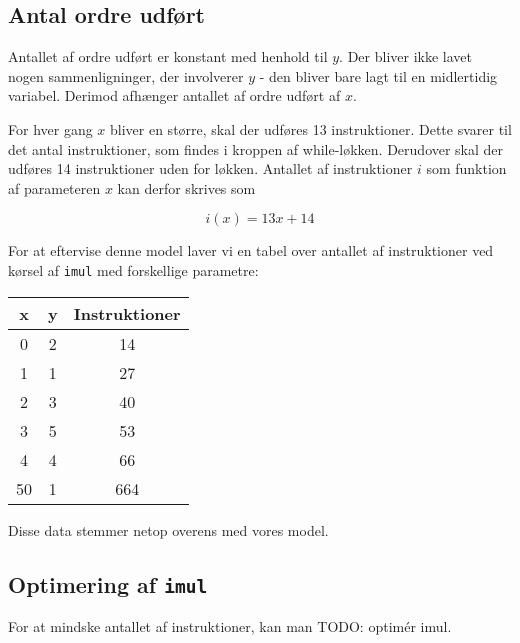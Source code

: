 \documentclass[12pt,a4paper]{article}
\newcommand{\imul}{\texttt{imul}}
\begin{document}
\subsection{Antal ordre udført}
Antallet af ordre udført er konstant med henhold til $y$. Der bliver ikke lavet
nogen sammenligninger, der involverer $y$ - den bliver bare lagt til en
midlertidig variabel. Derimod afhænger antallet af ordre udført af $x$.

For hver gang $x$ bliver en større, skal der udføres 13 instruktioner. Dette
svarer til det antal instruktioner, som findes i kroppen af while-løkken.
Derudover skal der udføres 14 instruktioner uden for løkken. Antallet af instruktioner $i$ som funktion af parameteren $x$ kan derfor skrives som

\[i(x) = 13x + 14\]

For at eftervise denne model laver vi en tabel over antallet af instruktioner
ved kørsel af \imul{} med forskellige parametre:

\begin{tabular}{|c|c|c|}
\hline
x & y & Instruktioner \\ \hline
0 & 2 & 14  \\ \hline
1 & 1 & 27  \\ \hline
2 & 3 & 40  \\ \hline
3 & 5 & 53  \\ \hline
4 & 4 & 66  \\ \hline
50& 1 & 664 \\ \hline

\end{tabular}

Disse data stemmer netop overens med vores model.

\subsection{Optimering af \imul{}}

For at mindske antallet af instruktioner, kan man TODO: optimér imul.
\end{document}
